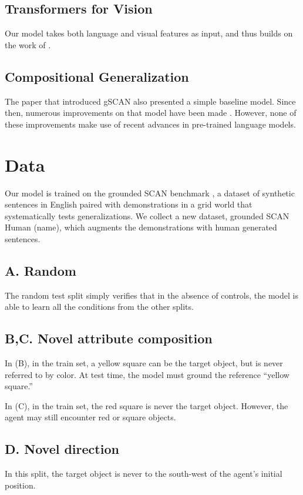 \documentclass[11pt]{article}
\begin{document}
\subsection{Transformers for Vision}
Our model takes both language and visual features as input, and thus builds on the work of \citep{LuViLBERT2019, tan-bansal-2019-lxmert, LiVisualBert2019}.

\subsection{Compositional Generalization}
The paper \citep{ruis2020benchmark} that introduced gSCAN also presented a simple baseline model.
%
Since then, numerous improvements on that model have been made \citep{gao-etal-2020-systematic, heinze-think-2020, kuo2020compositional}.
%
However, none of these improvements make use of recent advances in pre-trained language models. 

\section{Data}
Our model is trained on the grounded SCAN benchmark \citep{ruis2020benchmark}, a dataset of synthetic sentences in English paired with demonstrations in a grid world that systematically tests generalizations.
%
We collect a new dataset, grounded SCAN Human (\TODO name), which augments the demonstrations with human generated sentences.
%

\subsection*{A. Random}
The random test split simply verifies that in the absence of controls, the model is able to learn all the conditions from the other splits. 

\subsection*{B,C. Novel attribute composition}
In (B), in the train set, a yellow square can be the target object, but is never referred to by color. 
%
At test time, the model must ground the reference ``yellow square.''

In (C), in the train set, the red square is never the target object.
%
However, the agent may still encounter red or square objects.

\subsection*{D. Novel direction}
In this split, the target object is never to the south-west of the agent's initial position.
\end{document}
